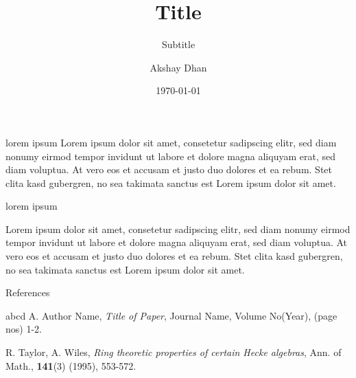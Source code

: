\documentclass{beamer}
\author{Akshay Dhan}
\title{Title}
\subtitle{Subtitle}
\institute{Institute}
\date{\today}
\theoremstyle{definition}
\theoremstyle{remark}
\begin{document}
\frame{\titlepage}

\begin{frame}{lorem ipsum}
Lorem ipsum dolor sit amet, consetetur sadipscing elitr, sed diam nonumy eirmod
	tempor invidunt ut labore et dolore magna aliquyam erat, sed diam
	voluptua. At vero eos et accusam et justo duo dolores et ea rebum. Stet
	clita kasd gubergren, no sea takimata sanctus est Lorem ipsum dolor sit
	amet.
\end{frame}
\begin{frame}{lorem ipsum}
	\begin{thm}[lorem]
Lorem ipsum dolor sit amet, consetetur sadipscing elitr, sed diam nonumy
		eirmod tempor invidunt ut labore et dolore magna aliquyam
		erat, sed diam voluptua. At vero eos et accusam et justo
		duo dolores et ea rebum. Stet clita kasd gubergren, no sea
		takimata sanctus est Lorem ipsum dolor sit amet.
\end{thm}
\end{frame}
\begin{frame}[t]{References}\vspace{10pt}
\begin{thebibliography}{abcd}
A. Author Name, 
{\it Title of Paper}, Journal Name, Volume No(Year), (page nos) 1-2.

R. Taylor, A. Wiles, {\it Ring theoretic properties of certain Hecke algebras}, Ann. of Math., \textbf{141}(3) (1995), 553-572.

\end{thebibliography}
\end{frame}
\end{document}
